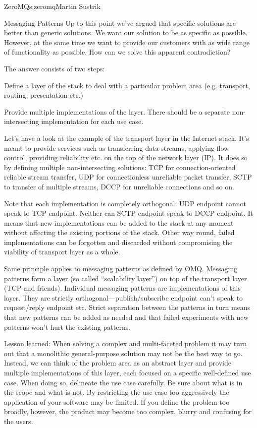 \begin{aosachapter}{ZeroMQ}{s:zeromq}{Martin Sustrik}
\begin{aosasect1}{Messaging Patterns}
Up to this point we've argued that specific solutions are better than
generic solutions. We want our solution to be as specific as
possible. However, at the same time we want to provide our customers
with as wide range of functionality as possible. How can we solve this
apparent contradiction?

The answer consists of two steps:

\begin{aosaenumerate}

\item Define a layer of the stack to deal with a particular problem
  area (e.g. transport, routing, presentation etc.)

\item Provide multiple implementations of the layer. There should be a
  separate non-intersecting implementation for each use case.

\end{aosaenumerate}

Let's have a look at the example of the transport layer in the
Internet stack. It's meant to provide services such as transferring
data streams, applying flow control, providing reliability etc. on the
top of the network layer (IP). It does so by defining multiple
non-intersecting solutions: TCP for connection-oriented reliable
stream transfer, UDP for connectionless unreliable packet transfer,
SCTP to transfer of multiple streams, DCCP for unreliable connections
and so on.

Note that each implementation is completely orthogonal: UDP endpoint
cannot speak to TCP endpoint. Neither can SCTP endpoint speak to DCCP
endpoint. It means that new implementations can be added to the stack
at any moment without affecting the existing portions of the
stack. Other way round, failed implementations can be forgotten and
discarded without compromising the viability of transport layer as a
whole.

Same principle applies to messaging patterns as defined by
{\O}MQ. Messaging patterns form a layer (so called ``scalability layer'')
on top of the transport layer (TCP and friends). Individual messaging
patterns are implementations of this layer. They are strictly
orthogonal---publish/subscribe endpoint can't speak to request/reply
endpoint etc. Strict separation between the patterns in turn means
that new patterns can be added as needed and that failed experiments
with new patterns won't hurt the existing patterns.

Lesson learned: When solving a complex and multi-faceted problem it
may turn out that a monolithic general-purpose solution may not be the
best way to go. Instead, we can think of the problem area as an
abstract layer and provide multiple implementations of this layer,
each focused on a specific well-defined use case. When doing so,
delineate the use case carefully. Be sure about what is in the scope
and what is not. By restricting the use case too aggressively the
application of your software may be limited. If you define the problem
too broadly, however, the product may become too complex, blurry and
confusing for the users.


\end{aosasect1}
\end{aosachapter}
